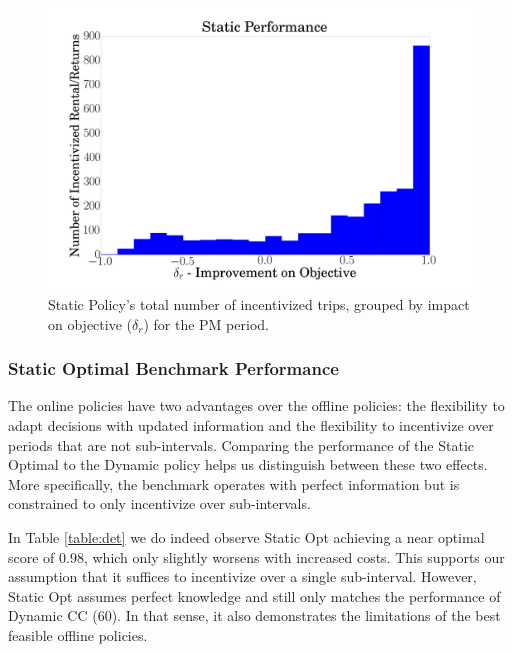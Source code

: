 \begin{figure}
\centering
\includegraphics[width=.5\textwidth]{../SubmissionPlots/ActuallyUsed/Static_Performance_PM.png}
\caption{Static Policy's total number of incentivized trips, grouped by impact on objective ($\delta_r$) for the PM period.}
\label{fig:Static Performance}
\end{figure}



\subsubsection{Static Optimal Benchmark Performance}
The online policies have two advantages over the offline policies: the flexibility to adapt decisions with updated information and the flexibility to incentivize over periods that are not sub-intervals. Comparing the performance of the Static Optimal to the Dynamic policy helps us  distinguish between these two effects. More specifically, the benchmark operates with perfect information but is constrained to only incentivize over sub-intervals. %

In Table \ref{table:det} we do indeed observe Static Opt achieving a near optimal score of 0.98, which only slightly worsens with increased costs. This supports our assumption that it suffices to incentivize over a single sub-interval. However, Static Opt assumes perfect knowledge and still only matches the performance of Dynamic CC (60). In that sense, it also demonstrates the limitations of the best feasible offline policies.

